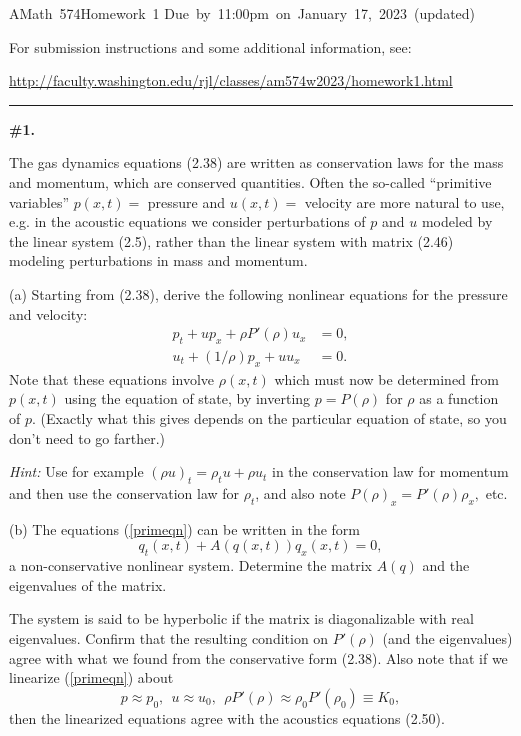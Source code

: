 \documentclass[11pt]{article}
\begin{document}
\hfill\vbox{\hbox{AMath 574}\hbox{Homework 1}
\hbox{Due by 11:00pm on January 17, 2023 (updated)}}

For submission instructions and some additional information, see:

\url{http://faculty.washington.edu/rjl/classes/am574w2023/homework1.html}


\vskip 1cm
\hrule
{\bf \#1.}

The gas dynamics equations (2.38) are written as conservation laws for the
mass and momentum, which are conserved quantities. Often the so-called
``primitive variables'' $p(x,t)=$ pressure and $u(x,t)=$ velocity are more
natural to use, e.g. in the acoustic equations we consider perturbations of
$p$ and $u$ modeled by the linear system (2.5), rather than the
linear system with matrix (2.46) modeling perturbations in mass and momentum.

(a) Starting from (2.38), derive the following nonlinear equations for the
pressure and velocity:
\begin{equation}\label{primeqn}
\begin{split}
p_t + up_x + \rho P'(\rho) u_x &= 0,\\
u_t + (1/\rho)p_x + uu_x &= 0.
\end{split} 
\end{equation} 
Note that these equations involve $\rho(x,t)$ which must now be determined
from $p(x,t)$ using the equation of state, by inverting $p = P(\rho)$ for
$\rho$ as a function of $p$.  (Exactly what this gives depends on the
particular equation of state, so you don't need to go farther.)

{\em Hint:} Use for example $(\rho u)_t = \rho_t u + \rho u_t$ in the
conservation law for momentum and then use the conservation law for
$\rho_t$, and also note $P(\rho)_x = P'(\rho)\rho_x,$ etc.

(b) The equations (\ref{primeqn}) can be written in the form 
\[
q_t(x,t) + A(q(x,t)) q_x(x,t) = 0,
\]
a non-conservative nonlinear system.  Determine the matrix $A(q)$ and
the eigenvalues of the matrix.  

The system is said to be hyperbolic if the matrix is diagonalizable
with real eigenvalues. Confirm that the resulting condition on
$P'(\rho)$ (and the eigenvalues) agree with what we found from the
conservative form (2.38).  
Also note that if we linearize (\ref{primeqn}) about
\[
p\approx p_0,~~ u\approx u_0,~~ \rho P'(\rho) \approx \rho_0
P'(\rho_0)\equiv K_0,
\]
then the linearized equations agree with the acoustics equations (2.50).
\end{document}
